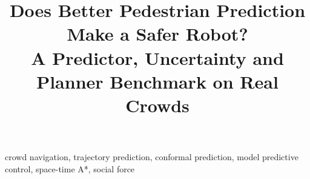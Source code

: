 \documentclass[conference]{IEEEtran}
\begin{document}
\title{Does Better Pedestrian Prediction Make a Safer Robot?\\
A Predictor, Uncertainty and Planner Benchmark on Real Crowds}

\author{
}

\maketitle

\begin{abstract}

\end{abstract}

\begin{IEEEkeywords}
crowd navigation, trajectory prediction, conformal prediction, model predictive control, space-time A*, social force
\end{IEEEkeywords}





\end{document}
